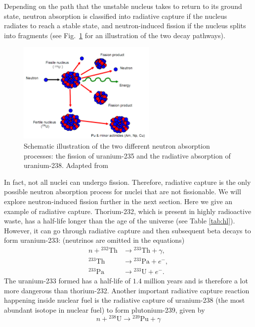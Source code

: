 \documentclass[nofootinbib,preprint,aps]{revtex4-1}
\begin{document}
    Depending on the path that the unstable nucleus takes to return to its ground
    state, neutron absorption is classified into radiative capture if the nucleus radiates to reach a stable
    state, and neutron-induced fission if the nucleus splits into fragments (see Fig.~\ref{fig:both} for an illustration
    of the two decay pathways).
        \begin{figure}
            \centering
            \includegraphics[width=0.6\textwidth]{pu.png}
            \caption{Schematic illustration of the two different neutron absorption processes:
            the fission of uranium-235 and the radiative absorption of uranium-238. Adapted from \cite{iync_2013}}
            \label{fig:both}
        \end{figure}
    In fact, not all nuclei can undergo fission.
    Therefore, radiative capture is the only possible neutron absorption process for
    nuclei that are not fissionable.\cite{lb01}
    We will explore neutron-induced fission further in the next section. Here we give an example of radiative capture. Thorium-232, which is present in highly radioactive
    waste, has a half-life longer than the age of the universe (see Table \ref{tab:hl}). However, it can go through
    radiative capture and then subsequent beta decays to form uranium-233: (neutrinos are omitted in the equations)
    \begin{align}
        n + {}^{232}\text{Th} &\rightarrow {}^{233}\text{Th} + \gamma,\\
        {}^{233}\text{Th} &\rightarrow {}^{233}\text{Pa} + e^-,\\
        {}^{233}\text{Pa} &\rightarrow {}^{233}\text{U} + e^-.
    \end{align}
    The uranium-233 formed has a half-life of $1.4$ million years and is therefore a lot more dangerous than
    thorium-232. Another important radiative capture reaction happening inside nuclear fuel is the radiative
    capture of uranium-238 (the most abundant isotope in nuclear fuel) to form plutonium-239, given
    by
    \begin{equation}
        n + {}^{238}\text{U} \rightarrow {}^{239}\text{Pu} + \gamma
    \end{equation}
\end{document}
